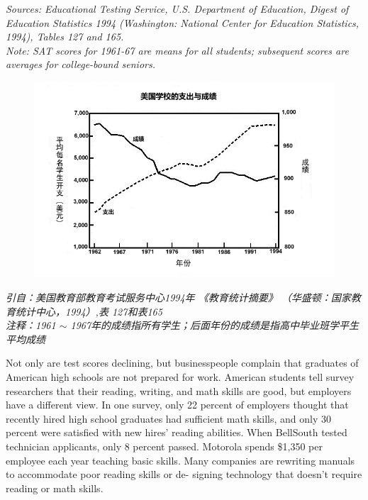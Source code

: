 \begin{paracol}{2}
\begin{figure}
\end{figure}
\begin{center}
	\textit{\footnotesize Sources: Educational Testing Service, U.S. Department of Education, Digest of Education Statistics 1994 (Washington: National Center for Education Statistics, 1994), Tables 127 and 165.\\	
	Note: SAT scores for 1961-67 are means for all students; subsequent scores are averages for college-bound seniors.}
\end{center}
\switchcolumn
\begin{figure}
	\centering
	\includegraphics[width=\linewidth]{4}
\end{figure}
\begin{center}
	\textit{\footnotesize 引自：美国教育部教育考试服务中心1994年 《教育统计摘要》 （华盛顿：国家教育统计中心，1994）,表 127和表165\\
	注释：1961 $\sim$ 1967年的成绩指所有学生；后面年份的成绩是指高中毕业班学平生平均成绩}
\end{center}
\switchcolumn*
Not only are test scores declining, but businesspeople complain that graduates of American high schools are not prepared
for work. American students tell survey researchers that their
reading, writing, and math skills are good, but employers have
a different view. In one survey, only 22 percent of employers
thought that recently hired high school graduates had sufficient math skills, and only 30 percent were satisfied with new
hires' reading abilities. When BellSouth tested technician applicants, only 8 percent passed. Motorola spends \$1,350 per
employee each year teaching basic skills. Many companies are
rewriting manuals to accommodate poor reading skills or de-
signing technology that doesn't require reading or math skills.

\end{paracol}
